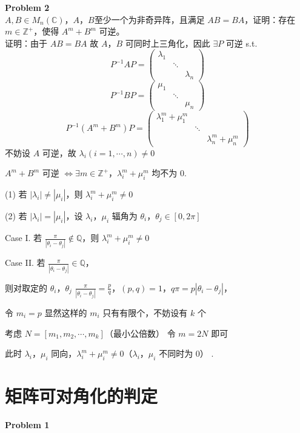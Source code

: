 \textbf{Problem 2}
\\
\(A,B\in M_n(\mathbb{C})\)，\(A\)，\(B\)至少一个为非奇异阵，且满足 \(AB = BA\)，证明：存在 \(m\in\mathbb{Z}^+\)，使得 \(A^m + B^m\) 可逆。
\\
证明：由于 \(AB = BA\)
故 \(A\)，\(B\) 可同时上三角化，因此 \(\exists P\) 可逆 s.t.
\[P^{-1}AP=\begin{pmatrix}
\lambda_1& & \\
& \ddots& \\
& & \lambda_n
\end{pmatrix}\]
\[P^{-1}BP=\begin{pmatrix}
\mu_1& & \\
& \ddots& \\
& & \mu_n
\end{pmatrix}\]
\[P^{-1}(A^m + B^m)P=\begin{pmatrix}
\lambda_1^m+\mu_1^m& & \\
& \ddots& \\
& & \lambda_n^m+\mu_n^m
\end{pmatrix}\]
不妨设 \(A\) 可逆，故 \(\lambda_i(i = 1,\cdots,n)\neq0\)
\par
\(A^m + B^m\) 可逆 \(\Leftrightarrow\exists m\in\mathbb{Z}^+\)，\(\lambda_i^m+\mu_i^m\) 均不为 \(0\).

(1) 若 \(|\lambda_i|\neq|\mu_i|\)，则 \(\lambda_i^m+\mu_i^m\neq0\)
\par
(2) 若 \(|\lambda_i| = |\mu_i|\)，设 \(\lambda_i\)，\(\mu_i\) 辐角为 \(\theta_i\)，\(\theta_j\in[0,2\pi]\)

Case I. 若 \(\frac{\pi}{|\theta_i - \theta_j|}\notin\mathbb{Q}\)，则 \(\lambda_i^m+\mu_i^m\neq0\)
\par
Case II. 若 \(\frac{\pi}{|\theta_i - \theta_j|}\in\mathbb{Q}\)，
\par
则对取定的 \(\theta_i\)，\(\theta_j\)
\(\frac{\pi}{|\theta_i - \theta_j|}=\frac{p}{q}\)，\((p,q)=1\)，\(q\pi = p|\theta_i - \theta_j|\)，
\par
令 \(m_i = p\)
显然这样的 \(m_i\) 只有有限个，不妨设有 \(k\) 个
\par
考虑 \(N=[m_1,m_2,\cdots,m_k]\)（最小公倍数）
令 \(m = 2N\) 即可
\par
此时 \(\lambda_i\)，\(\mu_i\) 同向，\(\lambda_i^m+\mu_i^m\neq0\)（\(\lambda_i\)，\(\mu_i\) 不同时为 \(0\)）  .

\section{矩阵可对角化的判定}
\textbf{Problem 1}

